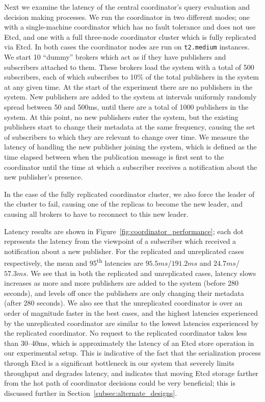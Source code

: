 Next we examine the latency of the central coordinator's query evaluation and decision making processes.
We run the coordinator in two different modes; one with a single-machine coordinator which has no fault tolerance and does not use Etcd, and one with a full three-node coordinator cluster which is fully replicated via Etcd.
In both cases the coordinator nodes are run on \texttt{t2.medium} instances.
We start 10 ``dummy'' brokers which act as if they have publishers and subscribers attached to them.
These brokers load the system with a total of 500 subscribers, each of which subscribes to 10\% of the total publishers in the system at any given time.
At the start of the experiment there are no publishers in the system.
New publishers are added to the system at intervals uniformly randomly spread between 50 and 500ms, until there are a total of 1000 publishers in the system.
At this point, no new publishers enter the system, but the existing publishers start to change their metadata at the same frequency, causing the set of subscribers to which they are relevant to change over time.
We measure the latency of handling the new publisher joining the system, which is defined as the time elapsed between when the publication message is first sent to the coordinator until the time at which a subscriber receives a notification about the new publisher's presence.

In the case of the fully replicated coordinator cluster, we also force the leader of the cluster to fail, causing one of the replicas to become the new leader, and causing all brokers to have to reconnect to this new leader.

Latency results are shown in Figure~\ref{fig:coordinator_performance}; each dot represents the latency from the viewpoint of a subscriber which received a notification about a new publisher.
For the replicated and unreplicated cases respectively, the mean and 95\textsuperscript{th} latencies are $95.5ms$/$191.2ms$ and $24.7ms$/$57.3ms$.
We see that in both the replicated and unreplicated cases, latency slows increases as more and more publishers are added to the system (before 280 seconds), and levels off once the publishers are only changing their metadata (after 280 seconds).
We also see that the unreplicated coordinator is over an order of magnitude faster in the best cases, and the highest latencies experienced by the unreplicated coordinator are similar to the lowest latencies experienced by the replicated coordinator.
No request to the replicated coordinator takes less than 30--40ms, which is approximately the latency of an Etcd store operation in our experimental setup.
This is indicative of the fact that the serialization process through Etcd is a significant bottleneck in our system that severely limits throughput and degrades latency, and indicates that moving Etcd storage farther from the hot path of coordinator decisions could be very beneficial; this is discussed further in Section~\ref{subsec:alternate_designs}.

